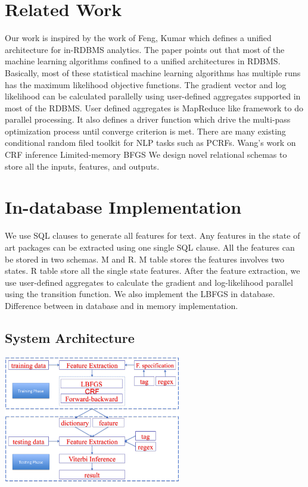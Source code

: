 \documentclass[11pt,letterpaper]{article}
\begin{document}
\section{Related Work}
Our work is inspired by the work of Feng, Kumar which defines a unified architecture for in-RDBMS analytics.
The paper points out that most of the machine learning algorithms confined to a unified architectures in RDBMS.
Basically, most of these statistical machine learning algorithms has multiple runs has the maximum likelihood objective functions. The gradient vector and log likelihood can be calculated parallelly using user-defined aggregates supported in most of the RDBMS. User defined aggregates is MapReduce like framework to do parallel processing.
It also defines a driver function which drive the multi-pass optimization process until converge criterion is met.
There are many existing conditional random filed toolkit for NLP tasks such as PCRFs. Wang's work on CRF inference Limited-memory BFGS We design novel relational schemas to store all the inputs, features, and outputs.

\section{In-database Implementation}
We use SQL clauses to generate all features for text. Any features in the state of art packages can be extracted using one single SQL clause.
All the features can be stored in two schemas. M and R. M table stores the features involves two states. R table store all the single state features.
After the feature extraction, we use user-defined aggregates to calculate the gradient and log-likelihood parallel using the transition function.
We also implement the LBFGS in database. Difference between in database and in memory implementation.
  
\subsection{System Architecture}
\begin{center}
\includegraphics[height=15em]{system.png}
\end{center}
\end{document}
